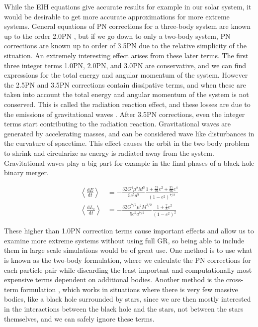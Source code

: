 \documentclass[english, oneside]{HYgradu}
\begin{document}
While the EIH equations give accurate results for example in our solar system, it would be desirable to get more accurate approximations for more extreme systems. General equations of PN corrections for a three-body system are known up to the order 2.0PN \citep{gravity}, but if we go down to only a two-body system, PN corrections are known up to order of 3.5PN due to the relative simplicity of the situation. An extremely interesting effect arises from these later terms. The first three integer terms 1.0PN, 2.0PN, and 3.0PN are conservative, and we can find expressions for the total energy and angular momentum of the system. However the 2.5PN and 3.5PN corrections contain dissipative terms, and when these are taken into account the total energy and angular momentum of the system is not conserved. This is called the radiation reaction effect, and these losses are due to the emissions of gravitational waves \citep{gravwaves}. After 3.5PN corrections, even the integer terms start contributing to the radiation reaction. Gravitational waves are generated by accelerating masses, and can be considered wave like disturbances in the curvature of spacetime. This effect causes the orbit in the two body problem to shrink and circularize as energy is radiated away from the system. Gravitational waves play a big part for example in the final phases of a black hole binary merger.

\begin{align}
\left< \frac{\mathrm{d} E}{\mathrm{d} t} \right> &= - \frac{32 G^4 \mu^2 M^3}{5 c^5 a^5} \frac{1 + \frac{73}{24}e^2 + \frac{37}{96}e^4}{(1-e^2)^{7/2}} \\
\left< \frac{\mathrm{d} L_z}{\mathrm{d} t} \right> &= - \frac{32 G^{7/2} \mu^2 M^{3/2}}{5 c^5 a^{7/2}} \frac{1 + \frac{7}{8}e^2}{(1-e^2)^2}
\end{align}

These higher than 1.0PN correction terms cause important effects and allow us to examine more extreme systems without using full GR, so being able to include them in large scale simulations would be of great use. One method is to use what is known as the two-body formulation, where we calculate the PN corrections for each particle pair while discarding the least important and computationally most expensive terms dependent on additional bodies. Another method is the cross-term formulation \citep{will:2014}, which works in situations where there is very few massive bodies, like a black hole surrounded by stars, since we are then mostly interested in the interactions between the black hole and the stars, not between the stars themselves, and we can safely ignore these terms.
\end{document}
